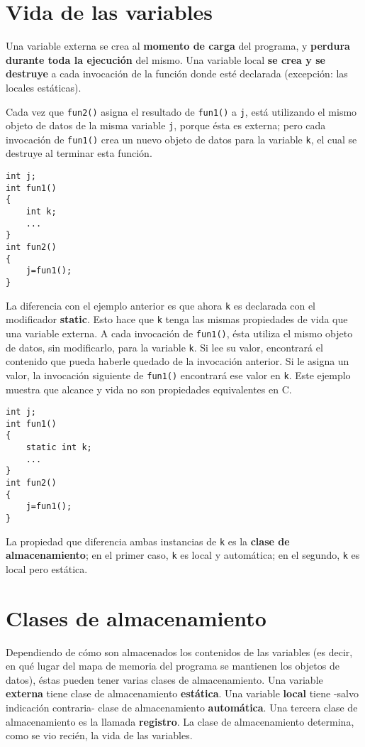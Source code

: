 \section{Vida de las variables}

Una variable externa se crea al \textbf{momento de carga} del programa, y \textbf{perdura durante toda la ejecución}
del mismo. Una variable local \textbf{se crea y se destruye} a cada invocación de la función donde esté
declarada (excepción: las locales estáticas).

\begin{ejemplo}
Cada vez que \lstinline{fun2()} asigna el resultado de \lstinline{fun1()} a \lstinline{j}, está utilizando el mismo objeto de datos de la misma variable \lstinline{j}, porque ésta es externa; pero cada invocación de \lstinline{fun1()} crea un nuevo objeto de datos para la variable \lstinline{k}, el cual se destruye al terminar esta función.
\begin{lstlisting}
int j;
int fun1()
{
	int k;
	...
}
int fun2()
{
	j=fun1();
}
\end{lstlisting}
\end{ejemplo}

\begin{ejemplo}

La diferencia con el ejemplo anterior es que ahora \lstinline{k} es declarada con el modificador \textbf{static}. Esto hace
que \lstinline{k} tenga las mismas propiedades de vida que una variable externa. A cada invocación de \lstinline{fun1()},
ésta utiliza el mismo objeto de datos, sin modificarlo, para la variable \lstinline{k}. Si lee su valor, encontrará el
contenido que pueda haberle quedado de la invocación anterior. Si le asigna un valor, la invocación siguiente de \lstinline{fun1()}
encontrará ese valor en \lstinline{k}. Este ejemplo muestra que alcance y vida no son propiedades equivalentes en
C. 
\begin{lstlisting}
int j;
int fun1()
{
	static int k;
	...
}
int fun2()
{
	j=fun1();
}
\end{lstlisting}
La propiedad que diferencia ambas instancias de \lstinline{k} es la \textbf{clase de almacenamiento}; en el primer caso,
\lstinline{k} es local y automática; en el segundo, \lstinline{k} es local pero estática. 
\end{ejemplo}


\section{Clases de almacenamiento}
Dependiendo de cómo son almacenados los contenidos de las variables (es decir, en qué lugar del mapa de memoria del programa se mantienen los objetos de datos), éstas pueden tener varias clases de almacenamiento. Una variable \textbf{externa} tiene clase de almacenamiento \textbf{estática}. Una variable \textbf{local} tiene -salvo indicación contraria- clase de almacenamiento \textbf{automática}. Una tercera clase de almacenamiento es la llamada \textbf{registro}. La clase de almacenamiento determina, como se vio recién, la vida de las variables.

